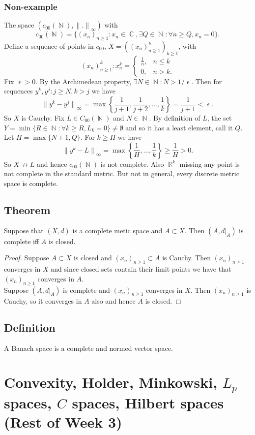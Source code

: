 \documentclass{article}
\DeclareMathOperator\eps{\epsilon}
\DeclareMathOperator\R{\mathbb{R}}
\DeclareMathOperator\N{\mathbb{N}}
\DeclareMathOperator\C{\mathbb{C}}
\newcommand{\seq}{(x_n)_{n \geq 1}}
\newcommand{\norm}{{\|.\|}}
\begin{document}
\subsubsection*{Non-example}
The space $(c_{00}(\N),\norm_{\infty})$ with $$
c_{00}(\N) = \{ \seq : x_n \in \C, \exists Q \in \N: \forall n \geq Q, x_n =0 \}.
$$
Define a sequence of points in $c_{00}$, $X = ((x_n)^k_{n \geq 1})_{k \geq 1}$,
with
$$
(x_n)^k_{n \geq 1}: x_n^k = \begin{cases}
\frac{1}{n}, & n \leq k \\
0, & n > k.
\end{cases}
$$
Fix $\eps>0$.
By the Archimedean property, $\exists N \in \N: N > 1 \slash \eps$.
Then for sequences $y^k,y^j: j \geq N, k > j$ we have
$$
{\|y^k-y^j\|}_{\infty} = \max \left \{ \frac{1}{j+1}, \frac{1}{j+2},
\hdots, \frac{1}{k} \right \}  = \frac{1}{j+1}  < \eps.
$$
So $X$ is Cauchy. Fix $L \in C_{00}(\N)$ and $N \in \N$.
By definition of $L$, the set $Y = \min \{ R \in \N: \forall k \geq R, L_k = 0 \} \not = \emptyset$
and so it has a least element, call it $Q$.
Let $H = \max \{N+1,Q\}$. For $k \geq H$ we have
$$
{\|y^k-L\|}_{\infty} = \max \left \{ \frac{1}{H}, \hdots, \frac{1}{k} \right \} \geq \frac{1}{H} > 0.
$$
So $X \not \to L$ and hence $c_{00}(\N)$ is not complete.
Also $\R^k$ missing any point is not complete in the standard metric. But not in general, every discrete metric space is complete.
\subsection*{Theorem}
Suppose that $(X,d)$ is a complete metic space and $A \subset X$. Then $(A,d {\vert_A})$ is complete iff $A$ is closed.
\begin{proof}
Suppose $A \subset X$ is closed and $\seq \subset A$ is Cauchy.
Then $\seq$ converges in $X$ and since closed sets contain their limit points
we have that $\seq$ converges in $A$. \\ \newline
Suppose $(A, d \vert_A)$ is complete and $\seq$ converges in $X$.
Then $\seq$ is Cauchy, so it converges in $A$ also and hence $A$ is closed.
\end{proof}
\subsection*{Definition}
A Banach space is a complete and normed vector space.
\section*{Convexity, Holder, Minkowski, $L_p$ spaces, $C$ spaces, Hilbert spaces (Rest of Week 3)}
\end{document}
